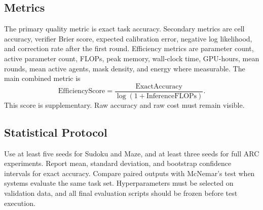 \documentclass[10pt,a4paper,twocolumn]{article}
\begin{document}
\subsection{Metrics}
The primary quality metric is exact task accuracy. Secondary metrics are cell accuracy, verifier Brier score, expected calibration error, negative log likelihood, and correction rate after the first round. Efficiency metrics are parameter count, active parameter count, FLOPs, peak memory, wall-clock time, GPU-hours, mean rounds, mean active agents, mask density, and energy where measurable. The main combined metric is
\begin{equation}
\mathrm{EfficiencyScore}=\frac{\mathrm{ExactAccuracy}}{\log(1+\mathrm{InferenceFLOPs})}. \label{eq:efficiency_score}
\end{equation}
This score is supplementary. Raw accuracy and raw cost must remain visible.

\subsection{Statistical Protocol}
Use at least five seeds for Sudoku and Maze, and at least three seeds for full ARC experiments. Report mean, standard deviation, and bootstrap confidence intervals for exact accuracy. Compare paired outputs with McNemar's test when systems evaluate the same task set. Hyperparameters must be selected on validation data, and all final evaluation scripts should be frozen before test execution.
\end{document}

